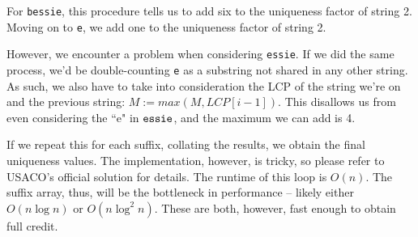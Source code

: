 \documentclass[11pt]{article}
\begin{document}
            For \verb|bessie|, this procedure tells us to add six to the uniqueness factor of string 2. Moving on to \verb|e|, we add one to the uniqueness factor of string 2.
            
            However, we encounter a problem when considering \verb|essie|. If we did the same process, we'd be double-counting \verb|e| as a substring not shared in any other string. As such, we also have to take into consideration the LCP of the string we're on and the previous string: $M := max(M, LCP[i-1])$. This disallows us from even considering the ``e" in $\verb|essie|$, and the maximum we can add is 4.
            
            If we repeat this for each suffix, collating the results, we obtain the final uniqueness values. The implementation, however, is tricky, so please refer to USACO's official solution for details. The runtime of this loop is $O(n)$. The suffix array, thus, will be the bottleneck in performance -- likely either $O(n \log n)$ or $O(n \log ^2 n)$. These are both, however, fast enough to obtain full credit.
            
        
            
            
\end{document}
